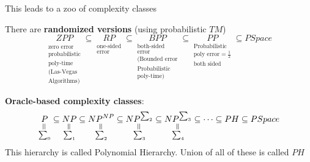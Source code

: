 {This leads to a zoo of complexity classes

There are \textbf{randomized versions} (using probabilistic $TM$)
$$\underset{ \substack{ \\ \text{zero error}\\ \text{probabilistic}\\ \text{poly-time}\\ \text{(Las-Vegas}\\ \text{Algorithms)}  } }{ZPP}\subseteq \underset{\substack{ \text{one-sided}\\\text{error} }}{RP} \subseteq \underset{ \substack{ \text{both-sided}\\\text{error}\\ \text{(Bounded error}\\ \text{Probabilistic} \\\text{poly-time)} } }{BPP} \subseteq \underset{\substack{ \text{Probabilistic}\\ \text{poly error}=\frac12\\ \text{both sided} }}{PP} \subseteq PSpace$$

\textbf{Oracle-based complexity classes}:
$$ \underset{ \substack{\ueq \\ \sum_0} }{P} \subseteq \underset{ \substack{\ueq \\ \sum_1} }{NP} \subseteq \underset{ \substack{\ueq \\ \sum_2} }{NP^{NP}} \subseteq \underset{ \substack{\ueq \\ \sum_3} }{NP^{\sum_2}}\subseteq \underset{ \substack{\ueq \\ \sum_4} }{NP^{\sum_3}} \subseteq \cdots\subseteq PH \subseteq PSpace$$This hierarchy is called Polynomial Hierarchy. Union of all of these is called $PH$

}
